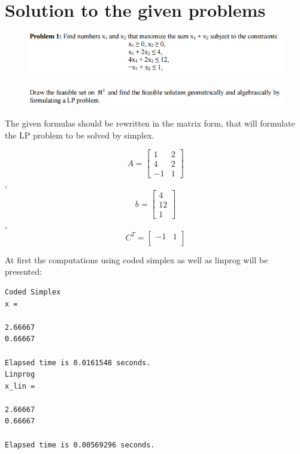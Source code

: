 \documentclass[eng,openany]{mgr}
\author{Jaroslaw M. Szumega}
\title{}
\date{15.05.2017}
\begin{document}
\maketitle
\tableofcontents
\newpage

\chapter{Solution to the given problems}
\begin{figure}[h]
\centering
\includegraphics[width=0.7\linewidth]{screenshot001}
\label{fig:screenshot001}
\end{figure}
\begin{figure}[h]
\centering
\includegraphics[width=0.7\linewidth]{screenshot002}
\label{fig:screenshot002}
\end{figure}

The given formulas should be rewritten in the matrix form, that will formulate the LP problem to be solved by simplex.


\[
A =
\begin{bmatrix}
1 & 2 \\
4 & 2\\
-1 & 1 
\end{bmatrix}
\]
,
\[
b =
\begin{bmatrix}
4 \\ 12\\  1
\end{bmatrix}
\],
\[
C^T =
\begin{bmatrix}
-1 & 1\\
\end{bmatrix}
\]

At first the computations using coded simplex as well as linprog will be presented:
\begin{lstlisting}
Coded Simplex
x =

2.66667
0.66667

Elapsed time is 0.0161548 seconds.
Linprog
x_lin =

2.66667
0.66667

Elapsed time is 0.00569296 seconds.
\end{lstlisting}
\end{document}
